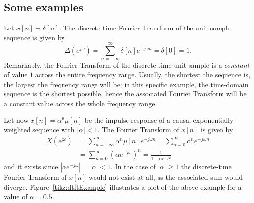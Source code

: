 \documentclass[\documentfontsize, twocolumn]{\classname}
\begin{document}
\subsection{Some examples}\label{sec:someExamplesDTFT}
Let $x[n] = \delta[n]$. The discrete-time Fourier Transform of the unit sample sequence is given by
\[
    \Delta(e^{j\omega}) = \sum_{n=-\infty}^\infty \delta[n]e^{-j\omega n} = \delta[0] = 1.
\]
Remarkably, the Fourier Transform of the discrete-time unit sample is a \emph{constant} of value $1$ across the entire frequency range. Usually, the shortest the sequence is, the largest the frequency range will be; in this specific example, the time-domain sequence is the shortest possible, hence the associated Fourier Transform will be a constant value across the whole frequency range.

Let now $x[n] = \alpha^n\mu[n]$ be the impulse response of a causal exponentially weighted sequence with $|\alpha|<1$. The Fourier Transform of $x[n]$ is given by
\begin{align*}
    X(e^{j\omega}) &= \sum_{n=-\infty}^\infty \alpha^n\mu[n]e^{-j\omega n} = \sum_{n=0}^\infty \alpha^n e^{-j\omega n} \\
                   &= \sum_{n=0}^\infty \left(\alpha e^{-j\omega}\right)^n = \frac{1}{1-\alpha e^{-j\omega}}
\end{align*}
and it exists since $\left|\alpha e^{-j\omega}\right| = |\alpha| < 1$. In the case of $|\alpha| \geq 1$ the discrete-time Fourier Transform of $x[n]$ would not exist at all, as the associated sum would diverge. Figure~\ref{tikz:dtftExample} illustrates a plot of the above example for a value of $\alpha=0.5$.
\end{document}
